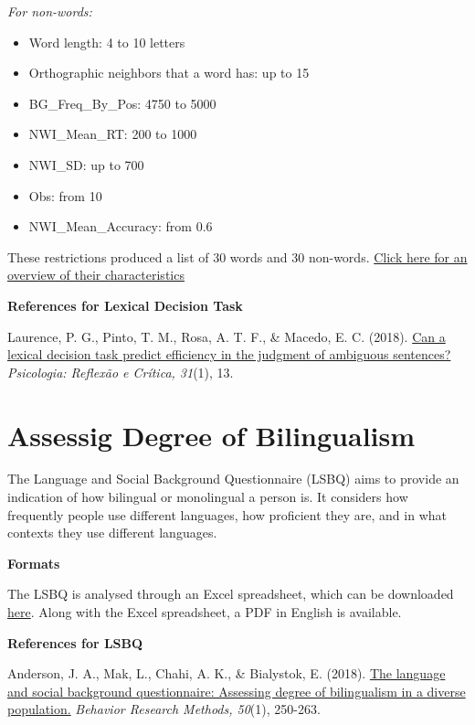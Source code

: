 \documentclass[
]{book}
\providecommand{\tightlist}{%
  \setlength{\itemsep}{0pt}\setlength{\parskip}{0pt}}
\begin{document}
\emph{For non-words:}

\begin{itemize}
\tightlist
\item
  Word length: 4 to 10 letters
\item
  Orthographic neighbors that a word has: up to 15
\item
  BG\_Freq\_By\_Pos: 4750 to 5000
\item
  NWI\_Mean\_RT: 200 to 1000
\item
  NWI\_SD: up to 700
\item
  Obs: from 10
\item
  NWI\_Mean\_Accuracy: from 0.6
\end{itemize}

These restrictions produced a list of 30 words and 30 non-words. \href{link\%20here\%20to\%20excel\%20file}{Click here for an overview of their characteristics}

\textbf{References for Lexical Decision Task}

Laurence, P. G., Pinto, T. M., Rosa, A. T. F., \& Macedo, E. C. (2018). \href{https://prc.springeropen.com/articles/10.1186/s41155-018-0093-0}{Can a lexical decision task predict efficiency in the judgment of ambiguous sentences?} \emph{Psicologia: Reflexão e Crítica, 31}(1), 13.

\hypertarget{assessig-degree-of-bilingualism}{%
\section{Assessig Degree of Bilingualism}\label{assessig-degree-of-bilingualism}}

The Language and Social Background Questionnaire (LSBQ) aims to provide an indication of how bilingual or monolingual a person is. It considers how frequently people use different languages, how proficient they are, and in what contexts they use different languages.

\textbf{Formats}

The LSBQ is analysed through an Excel spreadsheet, which can be downloaded \href{https://figshare.com/articles/The_Language_and_Social_Background_Questionnaire_Assessing_Degree_of_Bilingualism_in_a_Diverse_Population_Supplementary_Materials/3972486}{here}. Along with the Excel spreadsheet, a PDF in English is available.

\textbf{References for LSBQ}

Anderson, J. A., Mak, L., Chahi, A. K., \& Bialystok, E. (2018). \href{https://link.springer.com/article/10.3758/s13428-017-0867-9}{The language and social background questionnaire: Assessing degree of bilingualism in a diverse population.} \emph{Behavior Research Methods, 50}(1), 250-263.
\end{document}
